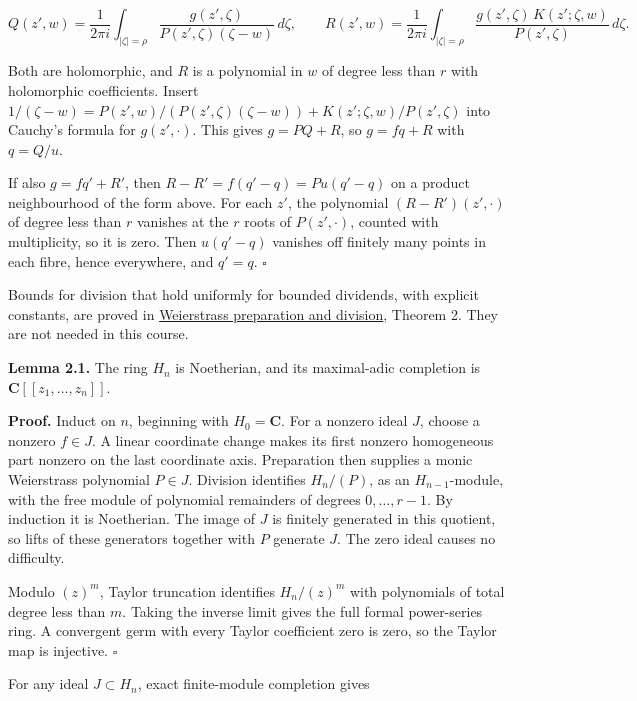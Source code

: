 \documentclass[11pt]{article}
\begin{document}
\[
Q(z',w)=\frac1{2\pi i}\int_{|\zeta|=\rho}\frac{g(z',\zeta)}{P(z',\zeta)(\zeta-w)}\,d\zeta,\qquad
R(z',w)=\frac1{2\pi i}\int_{|\zeta|=\rho}\frac{g(z',\zeta)\,K(z';\zeta,w)}{P(z',\zeta)}\,d\zeta .
\]

Both are holomorphic, and \(R\) is a polynomial in \(w\) of degree less
than \(r\) with holomorphic coefficients. Insert
\(1/(\zeta-w)=P(z',w)/(P(z',\zeta)(\zeta-w))+K(z';\zeta,w)/P(z',\zeta)\)
into Cauchy's formula for \(g(z',\cdot)\). This gives \(g=PQ+R\), so
\(g=fq+R\) with \(q=Q/u\).

If also \(g=fq'+R'\), then \(R-R'=f(q'-q)=Pu(q'-q)\) on a product
neighbourhood of the form above. For each \(z'\), the polynomial
\((R-R')(z',\cdot)\) of degree less than \(r\) vanishes at the \(r\)
roots of \(P(z',\cdot)\), counted with multiplicity, so it is zero. Then
\(u(q'-q)\) vanishes off finitely many points in each fibre, hence
everywhere, and \(q'=q\). \(\square\)

Bounds for division that hold uniformly for bounded dividends, with
explicit constants, are proved in
\href{../analytic-finiteness-and-preparation/weierstrass-preparation-and-division.html\#division-finite-generation-and-elementary-algebra}{Weierstrass
preparation and division}, Theorem 2. They are not needed in this
course.

\textbf{Lemma 2.1.} The ring \(H_n\) is Noetherian, and its maximal-adic
completion is \(\mathbf C[[z_1,\ldots,z_n]]\).

\textbf{Proof.} Induct on \(n\), beginning with \(H_0=\mathbf C\). For a
nonzero ideal \(J\), choose a nonzero \(f\in J\). A linear coordinate
change makes its first nonzero homogeneous part nonzero on the last
coordinate axis. Preparation then supplies a monic Weierstrass
polynomial \(P\in J\). Division identifies \(H_n/(P)\), as an
\(H_{n-1}\)-module, with the free module of polynomial remainders of
degrees \(0,\ldots,r-1\). By induction it is Noetherian. The image of
\(J\) is finitely generated in this quotient, so lifts of these
generators together with \(P\) generate \(J\). The zero ideal causes no
difficulty.

Modulo \((z)^m\), Taylor truncation identifies \(H_n/(z)^m\) with
polynomials of total degree less than \(m\). Taking the inverse limit
gives the full formal power-series ring. A convergent germ with every
Taylor coefficient zero is zero, so the Taylor map is injective.
\(\square\)

For any ideal \(J\subset H_n\), exact finite-module completion gives
\end{document}
